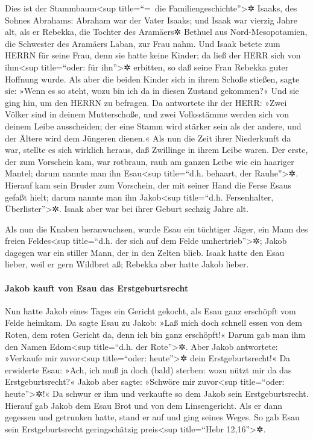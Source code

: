  Dies ist der Stammbaum\textless sup title=``=~die
Familiengeschichte''\textgreater✲ Isaaks, des Sohnes Abrahams: Abraham
war der Vater Isaaks;  und Isaak war vierzig Jahre alt,
als er Rebekka, die Tochter des Aramäers✲ Bethuel aus Nord-Mesopotamien,
die Schwester des Aramäers Laban, zur Frau nahm.  Und
Isaak betete zum HERRN für seine Frau, denn sie hatte keine Kinder; da
ließ der HERR sich von ihm\textless sup title=``oder: für
ihn''\textgreater✲ erbitten, so daß seine Frau Rebekka guter Hoffnung
wurde.  Als aber die beiden Kinder sich in ihrem Schoße
stießen, sagte sie: »Wenn es so steht, wozu bin ich da in diesen Zustand
gekommen?« Und sie ging hin, um den HERRN zu befragen. 
Da antwortete ihr der HERR: »Zwei Völker sind in deinem Mutterschoße,
und zwei Volksstämme werden sich von deinem Leibe ausscheiden; der eine
Stamm wird stärker sein als der andere, und der Ältere wird dem Jüngeren
dienen.«  Als nun die Zeit ihrer Niederkunft da war,
stellte es sich wirklich heraus, daß Zwillinge in ihrem Leibe waren.
 Der erste, der zum Vorschein kam, war rotbraun, rauh am
ganzen Leibe wie ein haariger Mantel; darum nannte man ihn
Esau\textless sup title=``d.h. behaart, der Rauhe''\textgreater✲.
 Hierauf kam sein Bruder zum Vorschein, der mit seiner
Hand die Ferse Esaus gefaßt hielt; darum nannte man ihn
Jakob\textless sup title=``d.h. Fersenhalter, Überlister''\textgreater✲.
Isaak aber war bei ihrer Geburt sechzig Jahre alt.

 Als nun die Knaben heranwuchsen, wurde Esau ein
tüchtiger Jäger, ein Mann des freien Feldes\textless sup title=``d.h.
der sich auf dem Felde umhertrieb''\textgreater✲; Jakob dagegen war ein
stiller Mann, der in den Zelten blieb.  Isaak hatte den
Esau lieber, weil er gern Wildbret aß; Rebekka aber hatte Jakob lieber.

\hypertarget{jakob-kauft-von-esau-das-erstgeburtsrecht}{%
\paragraph{Jakob kauft von Esau das
Erstgeburtsrecht}\label{jakob-kauft-von-esau-das-erstgeburtsrecht}}

 Nun hatte Jakob eines Tages ein Gericht gekocht, als
Esau ganz erschöpft vom Felde heimkam.  Da sagte Esau zu
Jakob: »Laß mich doch schnell essen von dem Roten, dem roten Gericht da,
denn ich bin ganz erschöpft!« Darum gab man ihm den Namen
Edom\textless sup title=``d.h. der Rote''\textgreater✲. 
Aber Jakob antwortete: »Verkaufe mir zuvor\textless sup title=``oder:
heute''\textgreater✲ dein Erstgeburtsrecht!«  Da
erwiderte Esau: »Ach, ich muß ja doch (bald) sterben: wozu nützt mir da
das Erstgeburtsrecht?«  Jakob aber sagte: »Schwöre mir
zuvor\textless sup title=``oder: heute''\textgreater✲!« Da schwur er ihm
und verkaufte so dem Jakob sein Erstgeburtsrecht. 
Hierauf gab Jakob dem Esau Brot und von dem Linsengericht. Als er dann
gegessen und getrunken hatte, stand er auf und ging seines Weges. So gab
Esau sein Erstgeburtsrecht geringschätzig preis\textless sup
title=``Hebr 12,16''\textgreater✲.

